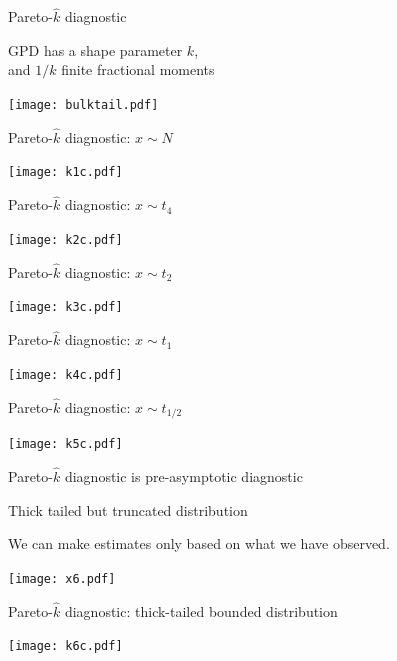 \documentclass[english,t]{beamer}
\begin{document}
\begin{frame}{Pareto-$\hat{k}$ diagnostic}

 GPD has a shape parameter $k$,\\and $1/k$ finite fractional
    moments

    {
      \vspace{-0.5\baselineskip}
  \texttt{[image: bulktail.pdf]}
}

\end{frame}

\begin{frame}{Pareto-$\hat{k}$ diagnostic: $x \sim N$}

  \texttt{[image: k1c.pdf]}

\end{frame}

\begin{frame}{Pareto-$\hat{k}$ diagnostic: $x \sim t_4$}

  \texttt{[image: k2c.pdf]}

\end{frame}

\begin{frame}{Pareto-$\hat{k}$ diagnostic: $x \sim t_2$}

  \texttt{[image: k3c.pdf]}

\end{frame}

\begin{frame}{Pareto-$\hat{k}$ diagnostic: $x \sim t_1$}

  \texttt{[image: k4c.pdf]}

\end{frame}

\begin{frame}{Pareto-$\hat{k}$ diagnostic: $x \sim t_{1/2}$}

  \texttt{[image: k5c.pdf]}

\end{frame}

\begin{frame}{Pareto-$\hat{k}$ diagnostic is pre-asymptotic diagnostic}

  Thick tailed but truncated distribution
  
  We can make estimates only based on what we have observed.

  \vspace{-0.5\baselineskip}
  \texttt{[image: x6.pdf]}

\end{frame}

\begin{frame}{Pareto-$\hat{k}$ diagnostic: thick-tailed bounded distribution}

  \texttt{[image: k6c.pdf]}

\end{frame}
\end{document}
